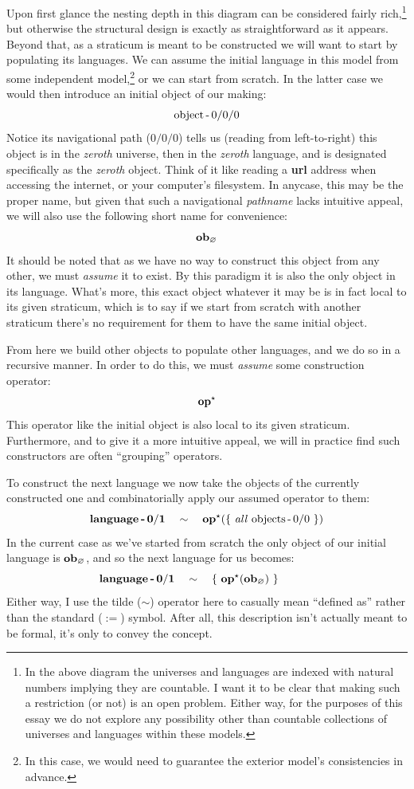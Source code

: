 \documentclass[twoside]{article}
\newcommand{\strong}[1]{{\bfseries #1}}
\newcommand{\bfmbox}[1]{\mbox{\bfseries #1}}
\newcommand{\tab}[1][1.125cm]{\hspace{#1}}
\begin{document}
Upon first glance the nesting depth in this diagram can be considered fairly rich,\footnote{In the above diagram the
universes and languages are indexed with natural numbers implying they are countable. I want it to be clear that making such
a restriction (or not) is an open problem. Either way, for the purposes of this essay we do not explore any possibility other
than countable collections of universes and languages within these models.} but otherwise the structural design is exactly
as straightforward as it appears. Beyond that, as a straticum is meant to be constructed we will want to start by populating
its languages. We can assume the initial language in this model from some independent model,\footnote{In this case, we would
need to guarantee the exterior model's consistencies in advance.} or we can start from scratch. In the latter case we would
then introduce an initial object of our making:
$$ \mbox{object\,-$\,0/0/0$} $$
Notice its navigational path ($ 0/0/0 $) tells us (reading from left-to-right) this object is in the \emph{zeroth} universe,
then in the \emph{zeroth} language, and is designated specifically as the \emph{zeroth} object. Think of it like reading
a \strong{url} address when accessing the internet, or your computer's filesystem. In anycase, this may be the proper name,
but given that such a navigational \emph{pathname} lacks intuitive appeal, we will also use the following short name for
convenience:
$$ \bfmbox{ob}_\varnothing $$
It should be noted that as we have no way to construct this object from any other, we must \emph{assume} it to exist. By this
paradigm it is also the only object in its language. What's more, this exact object whatever it may be is in fact local to its
given straticum, which is to say if we start from scratch with another straticum there's no requirement for them to have
the same initial object.

From here we build other objects to populate other languages, and we do so in a recursive manner. In order to do this,
we must \emph{assume} some construction operator:
$$ \bfmbox{op}^\star $$
This operator like the initial object is also local to its given straticum. Furthermore, and to give it a more intuitive
appeal, we will in practice find such constructors are often ``grouping'' operators.

To construct the next language we now take the objects of the currently constructed one and combinatorially apply
our assumed operator to them:
$$ \bfmbox{language\,-}\,\bf{0/1} \quad\sim\quad \bfmbox{op}^\star(\{\ \mbox{\emph{all} objects\,-$\,0/0$}\ \}) $$
In the current case as we've started from scratch the only object of our initial language is $ \bfmbox{ob}_\varnothing $,
and so the next language for us becomes:
$$ \tab[-7.5ex] \bfmbox{language\,-}\,\bf{0/1} \quad\sim\quad \{\ \bfmbox{op}^\star(\bfmbox{ob}_\varnothing)\ \} $$
Either way, I use the tilde ($ \sim $) operator here to casually mean ``defined as'' rather than the standard ($ := $)
symbol. After all, this description isn't actually meant to be formal, it's only to convey the concept.
\end{document}
